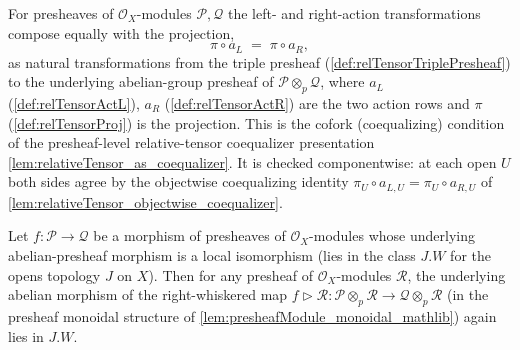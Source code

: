 \begin{lemma}

  \label{lem:snap_relTensorActL_proj_eq}
  For presheaves of \(\mathcal{O}_X\)-modules \(\mathcal{P}, \mathcal{Q}\) the
  left- and right-action transformations compose equally with the projection,
  \[
    \pi \circ a_L \;=\; \pi \circ a_R,
  \]
  as natural transformations from the triple presheaf
  (\cref{def:relTensorTriplePresheaf}) to the underlying abelian-group presheaf of
  \(\mathcal{P} \otimes_p \mathcal{Q}\), where \(a_L\)
  (\cref{def:relTensorActL}), \(a_R\) (\cref{def:relTensorActR}) are the two action
  rows and \(\pi\) (\cref{def:relTensorProj}) is the projection. This is the cofork
  (coequalizing) condition of the presheaf-level relative-tensor coequalizer
  presentation \cref{lem:relativeTensor_as_coequalizer}. It is checked
  componentwise: at each open \(U\) both sides agree by the objectwise coequalizing
  identity \(\pi_U \circ a_{L,U} = \pi_U \circ a_{R,U}\) of
  \cref{lem:relativeTensor_objectwise_coequalizer}.
\end{lemma}

\begin{lemma}
  \label{lem:snap_ztensor_whisker_localIso}
  Let \(f : \mathcal{P} \to \mathcal{Q}\) be a morphism of presheaves of
  \(\mathcal{O}_X\)-modules whose underlying abelian-presheaf morphism is a
  local isomorphism (lies in the class \(J.W\) for the opens topology \(J\)
  on \(X\)). Then for any presheaf of \(\mathcal{O}_X\)-modules \(\mathcal{R}\),
  the underlying abelian morphism of the right-whiskered map
  \(f \rhd \mathcal{R} : \mathcal{P} \otimes_p \mathcal{R} \to
  \mathcal{Q} \otimes_p \mathcal{R}\) (in the presheaf monoidal structure of
  \cref{lem:presheafModule_monoidal_mathlib}) again lies in \(J.W\).
\end{lemma}

